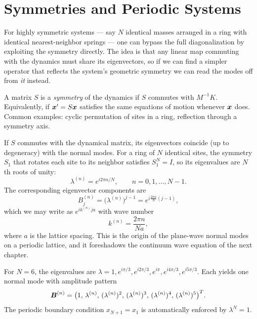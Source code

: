 \section{Symmetries and Periodic Systems}

For highly symmetric systems --- say $N$ identical masses arranged in a ring with identical nearest-neighbor springs --- one can bypass the full diagonalization by exploiting the symmetry directly. The idea is that any linear map commuting with the dynamics must share its eigenvectors, so if we can find a simpler operator that reflects the system's geometric symmetry we can read the modes off from \emph{it} instead.

\begin{definition}
A matrix $S$ is a \emph{symmetry} of the dynamics if $S$ commutes with $M^{-1} K$. Equivalently, if $\bm{x}' = S \bm{x}$ satisfies the same equations of motion whenever $\bm{x}$ does. Common examples: cyclic permutation of sites in a ring, reflection through a symmetry axis.
\end{definition}

If $S$ commutes with the dynamical matrix, its eigenvectors coincide (up to degeneracy) with the normal modes. For a ring of $N$ identical sites, the symmetry $S_1$ that rotates each site to its neighbor satisfies $S_1^N = I$, so its eigenvalues are $N$th roots of unity:
\begin{equation}
    \lambda^{(n)} = e^{i 2\pi n / N}, \qquad n = 0, 1, \ldots, N-1.
\end{equation}
The corresponding eigenvector components are
\begin{equation}
    B_j^{(n)} = \bigl(\lambda^{(n)}\bigr)^{j-1} = e^{i \frac{2\pi n}{N}(j-1)},
\end{equation}
which we may write as $e^{i k^{(n)} j a}$ with wave number
\begin{equation}
    k^{(n)} = \frac{2\pi n}{N a},
\end{equation}
where $a$ is the lattice spacing. This is the origin of the plane-wave normal modes on a periodic lattice, and it foreshadows the continuum wave equation of the next chapter.

\begin{example}
For $N = 6$, the eigenvalues are $\lambda = 1, e^{i\pi/3}, e^{i 2\pi/3}, e^{i\pi}, e^{i 4\pi/3}, e^{i 5\pi/3}$. Each yields one normal mode with amplitude pattern
\begin{equation}
    \vect{B}^{(n)} = \bigl(1,\, \lambda^{(n)},\, (\lambda^{(n)})^2,\, (\lambda^{(n)})^3,\, (\lambda^{(n)})^4,\, (\lambda^{(n)})^5\bigr)^T.
\end{equation}
The periodic boundary condition $x_{N+1} = x_1$ is automatically enforced by $\lambda^N = 1$.
\end{example}

